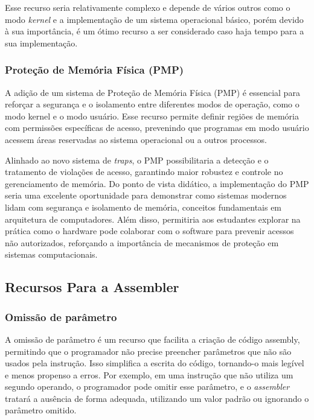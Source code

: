 \documentclass[
	12pt,				%
	openright,			%
	oneside,			%
	a4paper,			%
	english,			%
	french,				%
	spanish,			%
	brazil,				%
	]{abntex2}
\begin{document}
Esse recurso seria relativamente complexo e depende de vários outros como o modo \textit{kernel} e a implementação de um sistema operacional básico, porém devido à sua importância, é um ótimo recurso a ser considerado caso haja tempo para a sua implementação.

\subsubsection{Proteção de Memória Física (PMP)}\label{recursos_pmp}

A adição de um sistema de Proteção de Memória Física (PMP) é essencial para reforçar a segurança e o isolamento entre diferentes modos de operação, como o modo kernel e o modo usuário. Esse recurso permite definir regiões de memória com permissões específicas de acesso, prevenindo que programas em modo usuário acessem áreas reservadas ao sistema operacional ou a outros processos.

Alinhado ao novo sistema de \textit{traps}, o PMP possibilitaria a detecção e o tratamento de violações de acesso, garantindo maior robustez e controle no gerenciamento de memória. Do ponto de vista didático, a implementação do PMP seria uma excelente oportunidade para demonstrar como sistemas modernos lidam com segurança e isolamento de memória, conceitos fundamentais em arquitetura de computadores. Além disso, permitiria aos estudantes explorar na prática como o hardware pode colaborar com o software para prevenir acessos não autorizados, reforçando a importância de mecanismos de proteção em sistemas computacionais.

\subsection{Recursos Para a Assembler}
\subsubsection{Omissão de parâmetro}\label{recursos_omissao}
A omissão de parâmetro é um recurso que facilita a criação de código assembly, permitindo que o programador não precise preencher parâmetros que não são usados pela instrução. Isso simplifica a escrita do código, tornando-o mais legível e menos propenso a erros. Por exemplo, em uma instrução que não utiliza um segundo operando, o programador pode omitir esse parâmetro, e o \textit{assembler} tratará a ausência de forma adequada, utilizando um valor padrão ou ignorando o parâmetro omitido.
\end{document}
